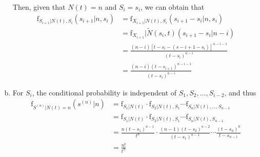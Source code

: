 \documentclass[UTF8]{article}
\begin{document}
\begin{enumerate}[a)]
        Then, given that $N(t)=n$ and $S_i=s_i$, we can obtain that
        \begin{equation*}
            \begin{aligned}
                \text{f}_{S_{i+1}|N(t),S_i}(s_{i+1}|n,s_i)
                &=\text{f}_{X_{i+1}|N(t),S_i}(s_{i+1}-s_i|n,s_i)\\
                &=\text{f}_{X_{i+1}}|\widetilde{N}(s_i,t)(s_{i+1}-s_i|n-i)\\
                &=\frac{(n-i)[t-s_i-(s-{i+1}-s_i)]^{n-i-1}}{(t-s_i)^{n-i}}\\
                &=\frac{(n-i)(t-s_{i+1})^{n-i-1}}{(t-s_i)^{n-i}}
            \end{aligned}
        \end{equation*}
    \item For $S_i$, the conditional probability is independent of $S_1,S_2,\dots,S_{i-2}$, and thus
        \begin{equation*}
            \begin{aligned}
                \text{f}_{S^{(n)}|N(t)=n}(s^{(n)}|n)
                &=\text{f}_{S_1|N(t)}\cdot\text{f}_{S_2|N(t),S_1}\cdots\text{f}_{S_n|N(t),\dots,S_{n-1}}\\
                &=\text{f}_{S_1|N(t)}\cdot\text{f}_{S_2|N(t),S_1}\cdots\text{f}_{S_n|N(t),S_{n-1}}\\
                &=\frac{n(t-s_1)^{n-1}}{t^n}\cdot\frac{(n-1)(t-s_2)^{n-2}}{(t-s_1)^{n-1}}\cdots\frac{(t-s_n)^0}{t-s_{n-1}}\\
                &=\frac{n!}{t^n}
            \end{aligned}
        \end{equation*}
\end{enumerate}
\end{document}
